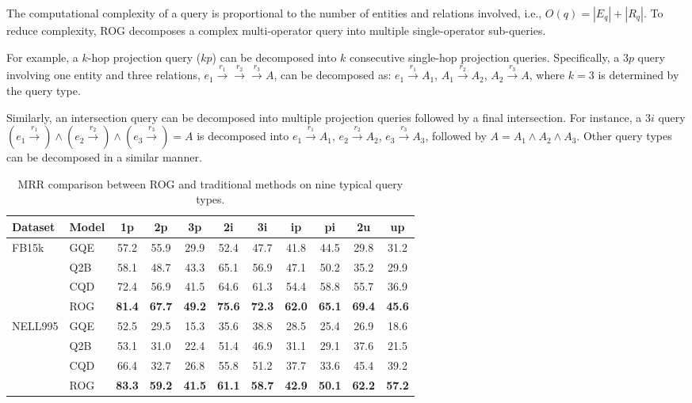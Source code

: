 \documentclass[11pt]{article}
\begin{document}
The computational complexity of a query is proportional to the number of entities and relations involved, i.e.,
$O(q) = |E_q| + |R_q|$.
To reduce complexity, ROG decomposes a complex multi-operator query into multiple single-operator sub-queries.

For example, a $k$-hop projection query ($kp$) can be decomposed into $k$ consecutive single-hop projection queries.
Specifically, a $3p$ query involving one entity and three relations,
$e_1 \xrightarrow{r_1} \xrightarrow{r_2} \xrightarrow{r_3} A$,
can be decomposed as:
$e_1 \xrightarrow{r_1} A_1$,
$A_1 \xrightarrow{r_2} A_2$,
$A_2 \xrightarrow{r_3} A$,
where $k=3$ is determined by the query type.

Similarly, an intersection query can be decomposed into multiple projection queries followed by a final intersection.
For instance, a $3i$ query
$(e_1 \xrightarrow{r_1}) \wedge (e_2 \xrightarrow{r_2}) \wedge (e_3 \xrightarrow{r_3}) = A$
is decomposed into
$e_1 \xrightarrow{r_1} A_1$,
$e_2 \xrightarrow{r_2} A_2$,
$e_3 \xrightarrow{r_3} A_3$,
followed by
$A = A_1 \wedge A_2 \wedge A_3$.
Other query types can be decomposed in a similar manner.


\begin{table}[t]
\centering
\small
\begin{tabular}{llccccccccc}
\toprule
Dataset & Model & 1p & 2p & 3p & 2i & 3i & ip & pi & 2u & up \\
\midrule
\multirow{4}{*}{FB15k}
& GQE & 57.2 & 55.9 & 29.9 & 52.4 & 47.7 & 41.8 & 44.5 & 29.8 & 31.2 \\
& Q2B & 58.1 & 48.7 & 43.3 & 65.1 & 56.9 & 47.1 & 50.2 & 35.2 & 29.9 \\
& CQD & 72.4 & 56.9 & 41.5 & 64.6 & 61.3 & 54.4 & 58.8 & 55.7 & 36.9 \\
& ROG & \textbf{81.4} & \textbf{67.7} & \textbf{49.2} & \textbf{75.6} & \textbf{72.3} & \textbf{62.0} & \textbf{65.1} & \textbf{69.4} & \textbf{45.6} \\
\midrule
\multirow{4}{*}{NELL995}
& GQE & 52.5 & 29.5 & 15.3 & 35.6 & 38.8 & 28.5 & 25.4 & 26.9 & 18.6 \\
& Q2B & 53.1 & 31.0 & 22.4 & 51.4 & 46.9 & 31.1 & 29.1 & 37.6 & 21.5 \\
& CQD & 66.4 & 32.7 & 26.8 & 55.8 & 51.2 & 37.7 & 33.6 & 45.4 & 39.2 \\
& ROG & \textbf{83.3} & \textbf{59.2} & \textbf{41.5} & \textbf{61.1} & \textbf{58.7} & \textbf{42.9} & \textbf{50.1} & \textbf{62.2} & \textbf{57.2} \\
\bottomrule
\end{tabular}
\caption{MRR comparison between ROG and traditional methods on nine typical query types.}
\label{tab:typical}
\end{table}
\end{document}
